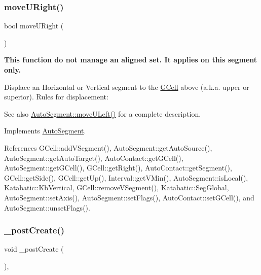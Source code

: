 \subsubsection{\texorpdfstring{move\+U\+Right()}{moveURight()}}
{\footnotesize\ttfamily bool move\+U\+Right (\begin{DoxyParamCaption}{ }\end{DoxyParamCaption})\hspace{0.3cm}{\ttfamily [virtual]}}

{\bfseries This function do not manage an aligned set. It applies on {\ttfamily this} segment only.}

Displace an Horizontal or Vertical segment to the \hyperlink{classKatabatic_1_1GCell}{G\+Cell} above (a.\+k.\+a. upper or superior). Rules for displacement\+:

\begin{DoxySeeAlso}{See also}
\hyperlink{classKatabatic_1_1AutoSegment_af8ca7b17e952f4b599aeeb2f4e5be395}{Auto\+Segment\+::move\+U\+Left()} for a complete description. 
\end{DoxySeeAlso}


Implements \hyperlink{classKatabatic_1_1AutoSegment_ad7fd54ca229fcf5ccd99f87b019b9cbc}{Auto\+Segment}.



References G\+Cell\+::add\+V\+Segment(), Auto\+Segment\+::get\+Auto\+Source(), Auto\+Segment\+::get\+Auto\+Target(), Auto\+Contact\+::get\+G\+Cell(), Auto\+Segment\+::get\+G\+Cell(), G\+Cell\+::get\+Right(), Auto\+Contact\+::get\+Segment(), G\+Cell\+::get\+Side(), G\+Cell\+::get\+Up(), Interval\+::get\+V\+Min(), Auto\+Segment\+::is\+Local(), Katabatic\+::\+Kb\+Vertical, G\+Cell\+::remove\+V\+Segment(), Katabatic\+::\+Seg\+Global, Auto\+Segment\+::set\+Axis(), Auto\+Segment\+::set\+Flags(), Auto\+Contact\+::set\+G\+Cell(), and Auto\+Segment\+::unset\+Flags().

\mbox{\label{classKatabatic_1_1AutoHorizontal_a3715b38135ca24745f610bebd3407c10}} 
\subsubsection{\texorpdfstring{\+\_\+post\+Create()}{\_postCreate()}}
{\footnotesize\ttfamily void \+\_\+post\+Create (\begin{DoxyParamCaption}{ }\end{DoxyParamCaption})\hspace{0.3cm}{\ttfamily [protected]}, {\ttfamily [virtual]}}

